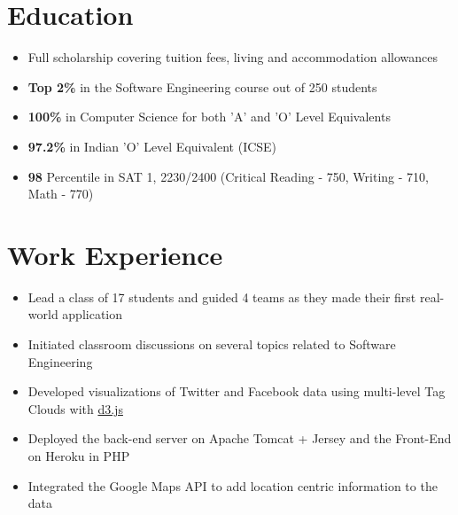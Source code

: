 \documentclass[11pt,a4paper]{moderncv}
\begin{document}
\makecvtitle

\section{Education}
{\begin{itemize}
        \item Full scholarship covering tuition fees, living and accommodation allowances
        \item \textbf{Top 2\%} in the Software Engineering course out of 250 students
 \end{itemize}}

{\begin{itemize}
        \item \textbf{100\%} in Computer Science for both 'A' and 'O' Level Equivalents
        \item \textbf{97.2\%} in Indian 'O' Level Equivalent (ICSE)
        \item \textbf{98} Percentile in SAT 1, 2230/2400 (Critical Reading - 750, Writing - 710, Math - 770)
 \end{itemize}}

\section{Work Experience}
{\begin{itemize}
        \item Lead a class of 17 students and guided 4 teams as they made their first real-world application
        \item Initiated classroom discussions on several topics related to Software Engineering
 \end{itemize}}

{\begin{itemize}
        \item Developed visualizations of Twitter and Facebook data using multi-level Tag Clouds with \href{http://d3js.org/}{d3.js}
        \item Deployed the back-end server on Apache Tomcat + Jersey and the Front-End on Heroku in PHP
        \item Integrated the Google Maps API to add location centric information to the data
 \end{itemize}}
\end{document}
